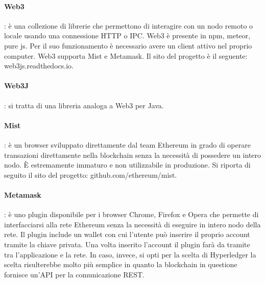 \paragraph{Web3}: è una collezione di librerie che permettono di interagire con un nodo remoto o locale usando una connessione HTTP o IPC. Web3 è presente in npm, meteor, pure js. Per il suo funzionamento è necessario avere un client attivo nel proprio computer. Web3 supporta Mist e Metamask. Il sito del progetto è il seguente: web3js.readthedocs.io.
\paragraph{Web3J}: si tratta di una libreria analoga a Web3 per Java.
\paragraph{Mist}: è un browser sviluppato direttamente dal team Ethereum in grado di operare transazioni direttamente nella blockchain senza la necessità di possedere un intero nodo. È estremamente immaturo e non utilizzabile in produzione. Si riporta di seguito il sito del progetto: github.com/ethereum/mist.
\paragraph{Metamask}: è uno plugin disponibile per i browser Chrome, Firefox e Opera che permette di interfacciarsi alla rete Ethereum senza la necessità di eseguire in intero nodo della rete. Il plugin include un wallet con cui l’utente può inserire il proprio account tramite la chiave privata. Una volta inserito l’account il plugin farà da tramite tra l’applicazione e la rete.
In caso, invece, si opti per la scelta di Hyperledger la scelta risulterebbe molto più semplice in quanto la blockchain in questione fornisce un’API per la comunicazione REST.


